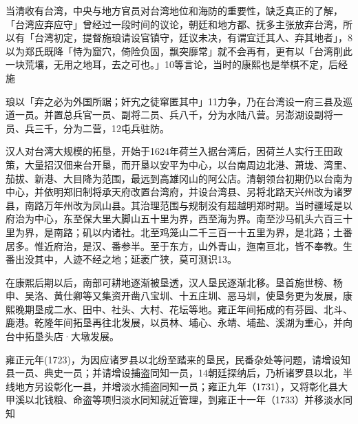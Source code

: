 
当清收有台湾，中央与地方官员对台湾地位和海防的重要性，缺乏真正的了解，「台湾应弃应守」曾经过一段时间的议论，朝廷和地方都、抚多主张放弃台湾，所以有「台湾初定，提督施琅请设官镇守，廷议未决，有谓宜迁其人、弃其地者」，8以为郑氏既降「恃为窟穴，倚险负固，飘突靡常」就不会再有，更有以「台湾削此一块荒壤，无用之地耳，去之可也。」10等言论，当时的康熙也是举棋不定，后经施

\vfill
\begin{BookNotes}
\end{BookNotes}

\noindent 琅以「弃之必为外国所踞；奸宄之徒窜匿其中」11力争，乃在台湾设一府三县及巡道一员。并置总兵官一员、副将二员、兵八千，分为水陆八营。另澎湖设副将一员、兵三千，分为二营，12屯兵驻防。


汉人对台湾大规模的拓垦，开始于1624年荷兰入据台湾后，因荷兰人实行王田政策，大量招汉佃来台开垦，而开垦以安平为中心，以台南周边北港、萧垅、湾里、茄拔、新港、大目降为范围，最远到高雄冈山的阿公店。清朝领台初期仍以台南为中心，并依明郑旧制将承天府改置台湾府，并设台湾县、另将北路天兴州改为诸罗县，南路万年州改为凤山县。其治理范围与规制没有超越明郑时期。当时疆域是以府治为中心，东至保大里大脚山五十里为界，西至海为界。南至沙马矶头六百三十里为界，是南路；矶以内诸社。北至鸡笼山二千三百一十五里为界，是北路；土番居多。惟近府治，是汉、番参半。至于东方，山外青山，迤南亘北，皆不奉教。生番出没其中，人迹不经之地；延袤广狭，莫可测识13。

在康熙后期以后，南部可耕地逐渐被垦透，汉人垦民逐渐北移。垦首施世榜、杨申、吴洛、黄仕卿等又集资开凿八宝圳、十五庄圳、恶马圳，使垦务更为发展，康熙晚期垦成二水、田中、社头、大村、花坛等地。雍正年间拓成的有芬园、北斗、鹿港。乾隆年间拓垦再往北发展，以员林、埔心、永靖、埔盐、溪湖为重心，并向台中拓垦头店·大墩发展。

雍正元年(1723)，为因应诸罗县以北纷至踏来的垦民，民番杂处等问题，请增设知县一员、典史一员；并请增设捕盗同知一员，14朝廷探纳后，乃析诸罗县以北，半线地方另设彰化一县，并增淡水捕盗同知一员；雍正九年（1731），又将彰化县大甲溪以北钱粮、命盗等项归淡水同知就近管理，到雍正十一年（1733）并移淡水同知

